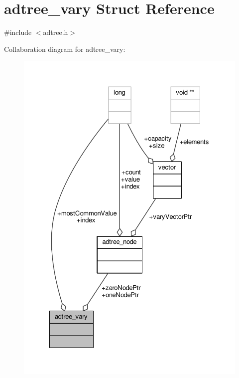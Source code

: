 \hypertarget{structadtree__vary}{\section{adtree\-\_\-vary Struct Reference}
\label{structadtree__vary}
}


{\ttfamily \#include $<$adtree.\-h$>$}



Collaboration diagram for adtree\-\_\-vary\-:
\nopagebreak
\begin{figure}[H]
\begin{center}
\leavevmode
\includegraphics[width=328pt]{structadtree__vary__coll__graph}
\end{center}
\end{figure}
